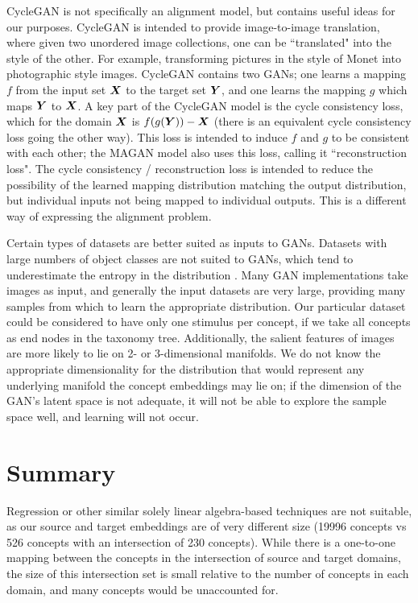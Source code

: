 CycleGAN \cite{CycleGAN} is not specifically an alignment model, but contains useful ideas for our purposes. CycleGAN is intended to provide image-to-image translation, where given two unordered image collections, one can be ``translated" into the style of the other. For example, transforming pictures in the style of Monet into photographic style images. CycleGAN contains two GANs; one learns a mapping $f$ from the input set $\boldsymbol{X}$ to the target set $\boldsymbol{Y}$, and one learns the mapping $g$ which maps $\boldsymbol{Y}$ to $\boldsymbol{X}$. A key part of the CycleGAN model is the cycle consistency loss, which for the domain $\boldsymbol{X}$ is $f(g(\boldsymbol{Y})) - \boldsymbol{X}$ (there is an equivalent cycle consistency loss going the other way). This loss is intended to induce $f$ and $g$ to be consistent with each other; the MAGAN model also uses this loss, calling it ``reconstruction loss". The cycle consistency / reconstruction loss is intended to reduce the possibility of the learned mapping distribution matching the output distribution, but individual inputs not being mapped to individual outputs. This is a different way of expressing the alignment problem. 

Certain types of datasets are better suited as inputs to GANs. Datasets with large numbers of object classes are not suited to GANs, which tend to underestimate the entropy in the distribution \cite{ImprovedTechniquesTrainingGANS}. Many GAN implementations take images as input, and generally the input datasets are very large, providing many samples from which to learn the appropriate distribution. Our particular dataset could be considered to have only one stimulus per concept, if we take all concepts as end nodes in the taxonomy tree.  Additionally, the salient features of images are more likely to lie on 2- or 3-dimensional manifolds. We do not know the appropriate dimensionality for the distribution that would represent any underlying manifold the concept embeddings may lie on; if the dimension of the GAN's latent space is not adequate, it will not be able to explore the sample space well, and learning will not occur. 

\section{Summary}
Regression or other similar solely linear algebra-based techniques are not suitable, as our source and target embeddings are of very different size (19996 concepts vs 526 concepts with an intersection of 230 concepts). While there is a one-to-one mapping between the concepts in the intersection of source and target domains, the size of this intersection set is small relative to the number of concepts in each domain, and many concepts would be unaccounted for. 

